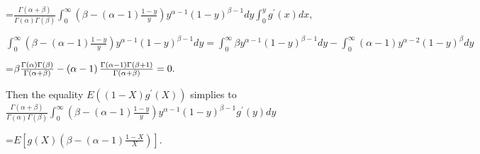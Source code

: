 \documentclass{article}
\begin{document}
=$\frac{\Gamma \left( \alpha +\beta \right) }{\Gamma \left( \alpha \right)
\Gamma \left( \beta \right) }\int_{0}^{\infty }\left( \beta -\left( \alpha
-1\right) \frac{1-y}{y}\right) y^{\alpha -1}\left( 1-y\right) ^{\beta
-1}dy\int_{0}^{y}g^{\prime }\left( x\right) dx,$

$\int_{0}^{\infty }\left( \beta -\left( \alpha -1\right) \frac{1-y}{y}%
\right) y^{\alpha -1}\left( 1-y\right) ^{\beta -1}dy=\int_{0}^{\infty }\beta
y^{\alpha -1}\left( 1-y\right) ^{\beta -1}dy-\int_{0}^{\infty }\left( \alpha
-1\right) y^{\alpha -2}\left( 1-y\right) ^{\beta }dy$

=$\beta \frac{\Gamma \left( \alpha \right) \Gamma \left( \beta \right) }{%
\Gamma \left( \alpha +\beta \right) }-\left( \alpha -1\right) \frac{\Gamma
\left( \alpha -1\right) \Gamma \left( \beta +1\right) }{\Gamma \left( \alpha
+\beta \right) }=0.$

Then the equality $E\left( \left( 1-X\right) g^{\prime }\left( X\right)
\right) $ simplies to $\frac{\Gamma \left( \alpha +\beta \right) }{\Gamma
\left( \alpha \right) \Gamma \left( \beta \right) }\int_{0}^{\infty }\left(
\beta -\left( \alpha -1\right) \frac{1-y}{y}\right) y^{\alpha -1}\left(
1-y\right) ^{\beta -1}g^{\prime }\left( y\right) dy$

=$E\left[ g\left( X\right) \left( \beta -\left( \alpha -1\right) \frac{1-X}{X%
}\right) \right] .$
\end{document}
